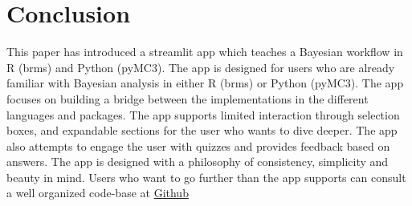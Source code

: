 \documentclass[12pt]{article}
\begin{document}
\section{Conclusion}
This paper has introduced a streamlit app which teaches a Bayesian workflow in R (brms)
and Python (pyMC3). The app is designed for users who are already familiar with Bayesian
analysis in either R (brms) or Python (pyMC3). The app focuses on building a bridge
between the implementations in the different languages and packages.
The app supports limited interaction through selection boxes, and expandable
sections for the user who wants to dive deeper. The app also attempts to engage
the user with quizzes and provides feedback based on answers. The app is designed with
a philosophy of consistency, simplicity and beauty in mind. Users who want to
go further than the app supports can consult a well organized code-base at
\href{https://github.com/victor-m-p/BayesWorkflow}{Github}
\printbibliography
\end{document}
